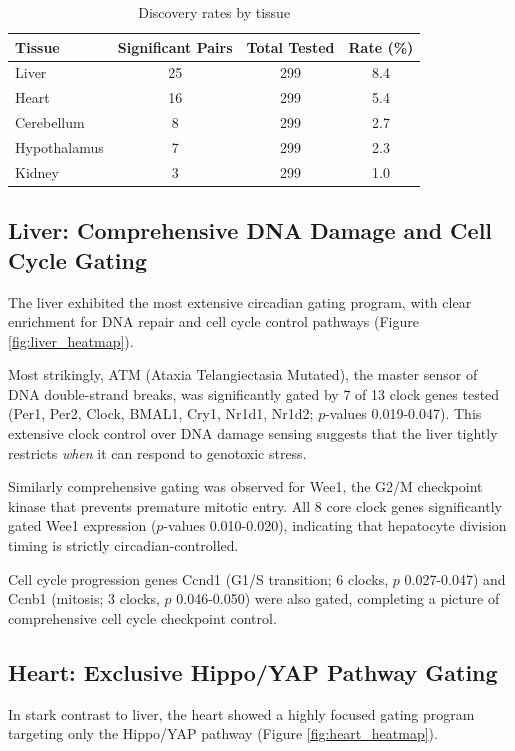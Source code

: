 \documentclass[10pt,letterpaper]{article}
\begin{document}
\begin{table}[H]
\centering
\caption{Discovery rates by tissue}
\label{tab:discovery_rates}
\begin{tabular}{lccc}
\toprule
\textbf{Tissue} & \textbf{Significant Pairs} & \textbf{Total Tested} & \textbf{Rate (\%)} \\
\midrule
Liver & 25 & 299 & 8.4 \\
Heart & 16 & 299 & 5.4 \\
Cerebellum & 8 & 299 & 2.7 \\
Hypothalamus & 7 & 299 & 2.3 \\
Kidney & 3 & 299 & 1.0 \\
\bottomrule
\end{tabular}
\end{table}

\subsection{Liver: Comprehensive DNA Damage and Cell Cycle Gating}

The liver exhibited the most extensive circadian gating program, with clear enrichment for DNA repair and cell cycle control pathways (Figure \ref{fig:liver_heatmap}).

Most strikingly, ATM (Ataxia Telangiectasia Mutated), the master sensor of DNA double-strand breaks, was significantly gated by 7 of 13 clock genes tested (Per1, Per2, Clock, BMAL1, Cry1, Nr1d1, Nr1d2; $p$-values 0.019-0.047). This extensive clock control over DNA damage sensing suggests that the liver tightly restricts \textit{when} it can respond to genotoxic stress.

Similarly comprehensive gating was observed for Wee1, the G2/M checkpoint kinase that prevents premature mitotic entry. All 8 core clock genes significantly gated Wee1 expression ($p$-values 0.010-0.020), indicating that hepatocyte division timing is strictly circadian-controlled.

Cell cycle progression genes Ccnd1 (G1/S transition; 6 clocks, $p$ 0.027-0.047) and Ccnb1 (mitosis; 3 clocks, $p$ 0.046-0.050) were also gated, completing a picture of comprehensive cell cycle checkpoint control.

\subsection{Heart: Exclusive Hippo/YAP Pathway Gating}

In stark contrast to liver, the heart showed a highly focused gating program targeting only the Hippo/YAP pathway (Figure \ref{fig:heart_heatmap}).
\end{document}
